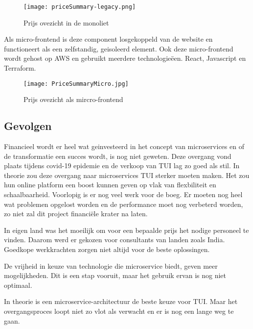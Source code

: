 \begin{figure}[!htb]
    \centering
    \texttt{[image: priceSummary-legacy.png]}
    \caption{Prijs ovezicht in de monoliet \label{pricelegacy}}
\end{figure}

Als micro-frontend is deze component losgekoppeld van de website en functioneert als een zelfstandig, geisoleerd element. Ook deze micro-frontend wordt gehost op AWS en gebruikt meerdere technologieëen. React, Javascript en Terraform.

\begin{figure}[!htb]
    \centering
    \texttt{[image: PriceSummaryMicro.jpg]}
    \caption{Prijs ovezicht als mircro-frontend \label{pricemicro}}
\end{figure}

\subsection{Gevolgen}

Financieel wordt er heel wat geinvesteerd in het concept van microservices en of de transformatie een succes wordt, is nog niet geweten. Deze overgang vond plaats tijdens covid-19 epidemie en de verkoop van TUI lag zo goed als stil. In theorie zou deze overgang naar microservices TUI sterker moeten maken. Het zou hun online platform een boost kunnen geven op vlak van flexbiliteit en schaalbaarheid. Voorlopig is er nog veel werk voor de boeg. Er moeten nog heel wat problemen opgelost worden en de performance moet nog verbeterd worden, zo niet zal dit project financiële krater na laten.

In eigen land was het moeilijk om voor een bepaalde prijs het nodige personeel te vinden. Daarom werd er gekozen voor consultants van landen zoals India. Goedkope werkkrachten zorgen niet altijd voor de beste oplossingen.  

De vrijheid in keuze van technologie die microservice biedt, geven meer mogelijkheden. Dit is een stap vooruit, maar het gebruik ervan is nog niet optimaal. 

In theorie is een microservice-architectuur de beste keuze voor TUI. Maar het overgangsproces loopt niet zo vlot als verwacht en er is nog een lange weg te gaan.
